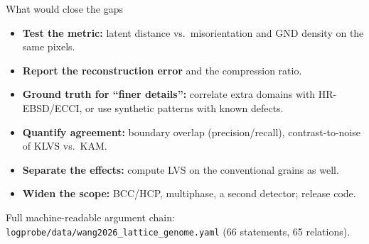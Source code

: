 \documentclass[aspectratio=169,10pt]{beamer}
\begin{document}
\begin{frame}{What would close the gaps}
\begin{itemize}\setlength\itemsep{6pt}
\item \textbf{Test the metric:} latent distance vs.\ misorientation and GND density on the same pixels.
\item \textbf{Report the reconstruction error} and the compression ratio.
\item \textbf{Ground truth for ``finer details'':} correlate extra domains with HR-EBSD/ECCI, or use synthetic patterns with known defects.
\item \textbf{Quantify agreement:} boundary overlap (precision/recall), contrast-to-noise of KLVS vs.\ KAM.
\item \textbf{Separate the effects:} compute LVS on the conventional grains as well.
\item \textbf{Widen the scope:} BCC/HCP, multiphase, a second detector; release code.
\end{itemize}
\vfill
\scriptsize Full machine-readable argument chain: \texttt{logprobe/data/wang2026\_lattice\_genome.yaml} (66 statements, 65 relations).
\end{frame}
\end{document}
